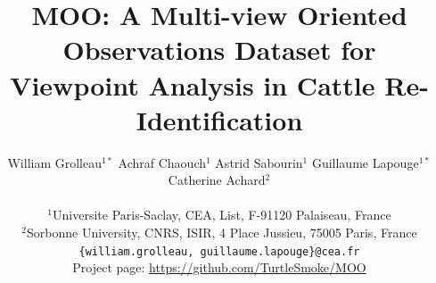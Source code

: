 \documentclass[10pt,twocolumn,letterpaper]{article}
\title{MOO: A Multi-view Oriented Observations Dataset for Viewpoint Analysis in Cattle Re-Identification}
\author{
William Grolleau$^{1*}$
Achraf Chaouch$^{1}$
Astrid Sabourin$^{1}$
Guillaume Lapouge$^{1*}$
Catherine Achard$^{2}$ \\
\\
{\small $^1$Universite Paris-Saclay, CEA, List, F-91120 Palaiseau, France} \\
{\small $^2$Sorbonne University, CNRS, ISIR, 4 Place Jussieu, 75005 Paris, France} \\
{\texttt{\small \{william.grolleau, guillaume.lapouge\}@cea.fr}} \\
Project page: \url{https://github.com/TurtleSmoke/MOO}
}
\begin{document}
    \maketitle
    
    
    
    
    
    
    
    

    {
        \small
        
        
    }
\end{document}
